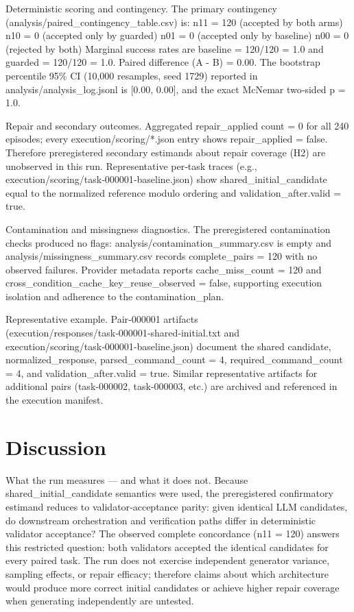 \documentclass[conference]{IEEEtran}
\begin{document}
Deterministic scoring and contingency. The primary contingency (analysis/paired\_contingency\_table.csv) is:
\textbullet{} n11 = 120 (accepted by both arms)
\textbullet{} n10 = 0 (accepted only by guarded)
\textbullet{} n01 = 0 (accepted only by baseline)
\textbullet{} n00 = 0 (rejected by both)
Marginal success rates are baseline = 120/120 = 1.0 and guarded = 120/120 = 1.0. Paired difference (A - B) = 0.00. The bootstrap percentile 95\% CI (10,000 resamples, seed 1729) reported in analysis/analysis\_log.jsonl is [0.00, 0.00], and the exact McNemar two‑sided p = 1.0.

Repair and secondary outcomes. Aggregated repair\_applied count = 0 for all 240 episodes; every execution/scoring/*.json entry shows repair\_applied = false. Therefore preregistered secondary estimands about repair coverage (H2) are unobserved in this run. Representative per‑task traces (e.g., execution/scoring/task‑000001‑baseline.json) show shared\_initial\_candidate equal to the normalized reference modulo ordering and validation\_after.valid = true.

Contamination and missingness diagnostics. The preregistered contamination checks produced no flags: analysis/contamination\_summary.csv is empty and analysis/missingness\_summary.csv records complete\_pairs = 120 with no observed failures. Provider metadata reports cache\_miss\_count = 120 and cross\_condition\_cache\_key\_reuse\_observed = false, supporting execution isolation and adherence to the contamination\_plan.

Representative example. Pair‑000001 artifacts (execution/responses/task‑000001‑shared‑initial.txt and execution/scoring/task‑000001‑baseline.json) document the shared candidate, normalized\_response, parsed\_command\_count = 4, required\_command\_count = 4, and validation\_after.valid = true. Similar representative artifacts for additional pairs (task‑000002, task‑000003, etc.) are archived and referenced in the execution manifest.

\section{Discussion}
What the run measures --- and what it does not. Because shared\_initial\_candidate semantics were used, the preregistered confirmatory estimand reduces to validator‑acceptance parity: given identical LLM candidates, do downstream orchestration and verification paths differ in deterministic validator acceptance? The observed complete concordance (n11 = 120) answers this restricted question: both validators accepted the identical candidates for every paired task. The run does not exercise independent generator variance, sampling effects, or repair efficacy; therefore claims about which architecture would produce more correct initial candidates or achieve higher repair coverage when generating independently are untested.
\end{document}
